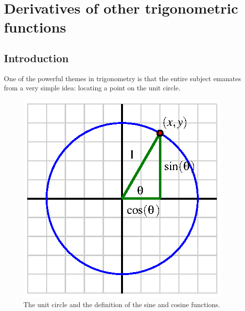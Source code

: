 \section{Derivatives of other trigonometric functions} \label{S:2.4.OtherTrig}

\vspace*{-14 pt}

\subsection*{Introduction}

One of the powerful themes in trigonometry  is that the entire subject emanates from a very simple idea: locating a point on the unit circle.

\begin{figure}[h]
\begin{center}
\includegraphics{figures/2_4_UnitCircle.eps}
\caption{The unit circle and the definition of the sine and cosine functions.} \label{F:2.4.UnitCircle}
\end{center}
\end{figure}

